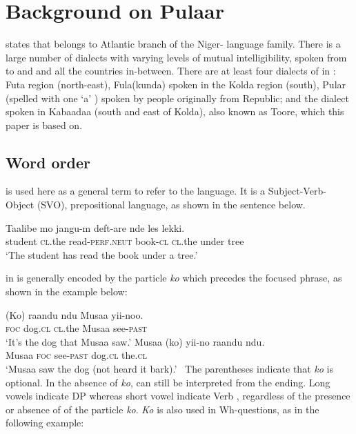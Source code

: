 \documentclass[output=paper,
modfonts
]{langscibook}
\begin{document}
 
\section{Background on Pulaar}\label{sec:ba:2}
\citet{Lewis2009} states that  belongs to Atlantic branch of the Niger- language family. There is a large number of  dialects with varying levels of mutual intelligibility, spoken from  to  and  and all the countries in-between. There are at least four dialects of  in : Futa  region (north-east), Fula(kunda) spoken in the Kolda region (south), Pular (spelled with one ‘a’ ) spoken by people originally from  Republic; and the dialect spoken in Kabaadaa (south and east of Kolda), also known as Toore, which this paper is based on.


\subsection{Word order}\label{sec:ba:2.1}


 is used here as a general term to refer to the language. It is a Subject-Verb-Object (SVO), prepositional language, as shown in the sentence below.

 
 \ea\label{ex:ba:5}
\gll  Taalibe      mo       jangu-m                deft-are    nde        les       lekki.\\
     student      \textsc{cl.}the    read-\textsc{perf.neut}     book-\textsc{cl} \textsc{cl.}the    under   tree\\
\glt    ‘The student has read the book under a tree.’              
\z
 
 in  is generally encoded by the particle \textit{ko} which precedes the focused phrase, as shown in the example below:
 
 \ea\label{ex:ba:6}
 \ea\settowidth{}
 \gll  (Ko)  raandu   ndu     Musaa  yii-noo.\\
       \textsc{foc}    dog.\textsc{cl}  \textsc{cl}.the  Musaa  see-\textsc{past} \\
\glt       ‘It’s the dog that Musaa saw.’
\ex\settowidth{}
\gll Musaa (ko)  yii-no      raandu ndu.\\
       Musaa  \textsc{foc}  see-\textsc{past} dog.\textsc{cl} the.\textsc{cl}\\
\glt       ‘Musaa saw the dog (not heard it bark).’
\z
\z
\
The parentheses indicate that \textit{ko} is optional. In the absence of \textit{ko},  can still be interpreted from the  ending. Long vowels indicate DP  whereas short vowel indicate Verb , regardless of the presence or absence of of the  particle \textit{ko}. \textit{Ko} is also used in Wh-questions, as in the following example:
\end{document}

